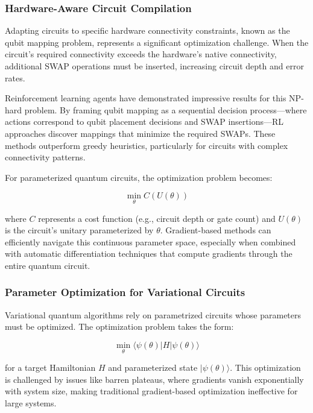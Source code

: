 \subsubsection{Hardware-Aware Circuit Compilation}

Adapting circuits to specific hardware connectivity constraints, known as the qubit mapping problem, represents a significant optimization challenge. When the circuit's required connectivity exceeds the hardware's native connectivity, additional SWAP operations must be inserted, increasing circuit depth and error rates.

Reinforcement learning agents have demonstrated impressive results for this NP-hard problem. By framing qubit mapping as a sequential decision process—where actions correspond to qubit placement decisions and SWAP insertions—RL approaches discover mappings that minimize the required SWAPs. These methods outperform greedy heuristics, particularly for circuits with complex connectivity patterns.

For parameterized quantum circuits, the optimization problem becomes:

\begin{equation}
\min_{\theta} C(U(\theta))
\end{equation}

where $C$ represents a cost function (e.g., circuit depth or gate count) and $U(\theta)$ is the circuit's unitary parameterized by $\theta$. Gradient-based methods can efficiently navigate this continuous parameter space, especially when combined with automatic differentiation techniques that compute gradients through the entire quantum circuit.

\subsubsection{Parameter Optimization for Variational Circuits}

Variational quantum algorithms rely on parametrized circuits whose parameters must be optimized. The optimization problem takes the form:

\begin{equation}
\min_{\theta} \langle \psi(\theta) | H | \psi(\theta) \rangle
\end{equation}

for a target Hamiltonian $H$ and parameterized state $|\psi(\theta)\rangle$. This optimization is challenged by issues like barren plateaus, where gradients vanish exponentially with system size, making traditional gradient-based optimization ineffective for large systems.

